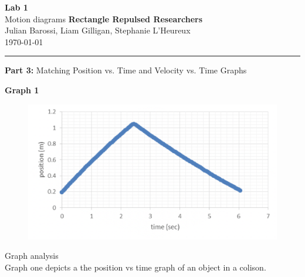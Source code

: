\documentclass[12pt, letterpaper]{article}
\begin{document}
  \begin{titlepage} 
    \begin{center}
      \Huge{\textbf{Lab 1}}\\
      \Huge{Motion diagrams}
      \vfill
      \large{\textbf{Rectangle Repulsed Researchers}}\\
      \large{Julian Barossi, Liam Gilligan, Stephanie L'Heureux}\\
      \vspace*{0.5cm}
      \normalsize
      \today
    \end{center}
  \end{titlepage}

  \begin{center}
    \rule{\textwidth}{0.5pt}
    \normalsize{\textbf{Part 3:} Matching Position vs. Time and Velocity vs. Time Graphs}\\
    \vspace{0.5cm}
  \end{center}

  \begin{center}
    \Large\textbf{{Graph 1}}\\
  \end{center}

  \begin{figure}[H]
    \centering 
    \includegraphics[width=\linewidth]{graph_1.png}
    \label{fig:graph1}
  \end{figure}


  \large{Graph analysis}\\
  Graph one depicts a the position vs time graph of an object in a colison.
\end{document}
